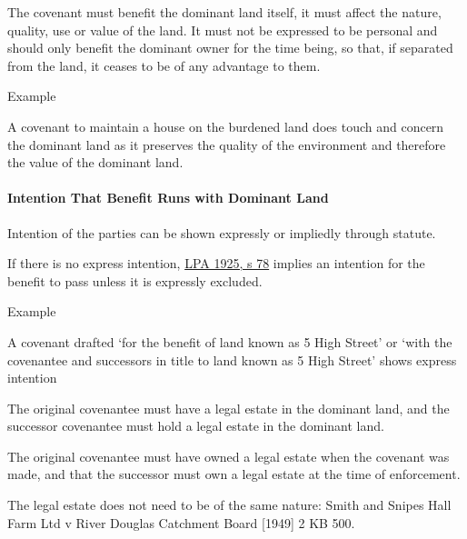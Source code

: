 \documentclass[
]{article}
\newenvironment{env-c75278ec-0f81-4db3-97b1-0452147ba646}
{
    \savenotes\tcolorbox[blanker,breakable,left=5pt,borderline west={2pt}{-4pt}{purple}]
}
{
    \endtcolorbox\spewnotes
}
\begin{document}
The covenant must benefit the dominant land itself, it must affect the
nature, quality, use or value of the land. It must not be expressed to
be personal and should only benefit the dominant owner for the time
being, so that, if separated from the land, it ceases to be of any
advantage to them.

\begin{env-c75278ec-0f81-4db3-97b1-0452147ba646}

Example

A covenant to maintain a house on the burdened land does touch and
concern the dominant land as it preserves the quality of the environment
and therefore the value of the dominant land.

\end{env-c75278ec-0f81-4db3-97b1-0452147ba646}

\hypertarget{intention-that-benefit-runs-with-dominant-land}{%
\paragraph{Intention That Benefit Runs with Dominant
Land}\label{intention-that-benefit-runs-with-dominant-land}}

Intention of the parties can be shown expressly or impliedly through
statute.

If there is no express intention,
\href{https://www.legislation.gov.uk/ukpga/Geo5/15-16/20/section/78}{LPA
1925, s 78} implies an intention for the benefit to pass unless it is
expressly excluded.

\begin{env-c75278ec-0f81-4db3-97b1-0452147ba646}

Example

A covenant drafted `for the benefit of land known as 5 High Street' or
`with the covenantee and successors in title to land known as 5 High
Street' shows express intention

\end{env-c75278ec-0f81-4db3-97b1-0452147ba646}

The original covenantee must have a legal estate in the dominant land,
and the successor covenantee must hold a legal estate in the dominant
land.

The original covenantee must have owned a legal estate when the covenant
was made, and that the successor must own a legal estate at the time of
enforcement.

The legal estate does not need to be of the same nature: Smith and
Snipes Hall Farm Ltd v River Douglas Catchment Board {[}1949{]} 2 KB
500.
\end{document}
